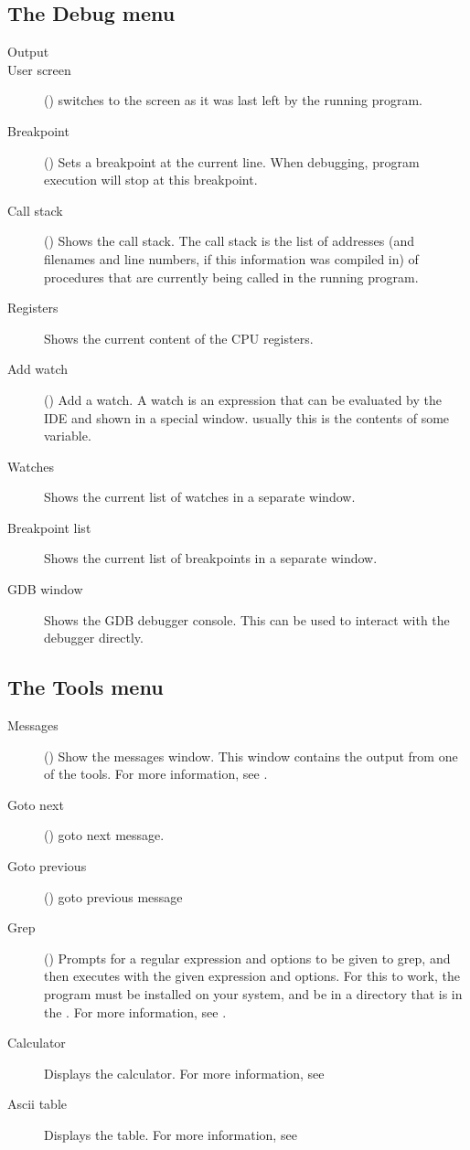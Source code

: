 \subsection{The Debug menu}
\label{se:menudebug}
\begin{description}
\item[Output]
\item[User screen] () switches to the screen as it was last
left by the running program.
\item[Breakpoint] ()
Sets a breakpoint at the current line. When debugging, program execution
will stop at this breakpoint.
\item[Call stack] ()
Shows the call stack. The call stack is the list of addresses (and
filenames and line numbers, if this information was compiled in) of 
procedures that are currently being called in the running program.
\item[Registers]
Shows the current content of the CPU registers. 
\item[Add watch] () Add a watch. A watch is an expression
that can be evaluated by the IDE and shown in a special window. usually this
is the contents of some variable. 
\item[Watches]
Shows the current list of watches in a separate window.
\item[Breakpoint list]
Shows the current list of breakpoints in a separate window.
\item[GDB window]
Shows the GDB debugger console. This can be used to interact with the debugger
directly.
\end{description}
%
%
\subsection{The Tools menu}
\label{se:menutools}
\begin{description}
\item[Messages] () Show the messages window. 
This window contains the output from one of the tools. For more information,
see .
\item[Goto next] () goto next message.
\item[Goto previous] () goto previous message
\item[Grep] () Prompts for a regular expression and options
to be given to grep, and then executes  with the given expression and
options. For this to work, the  program must be installed on your
system, and be in a directory that is in the . For more
information, see .
\item[Calculator] 
Displays the calculator. For more information, see 
\item[Ascii table] Displays the  table. For more information, see
\end{description}
%
%
